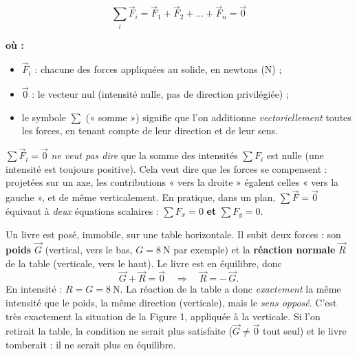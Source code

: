 \documentclass[11pt,a4paper]{article}
\newenvironment{ou}{%
  \par\smallskip\noindent\textbf{où :}\nopagebreak
  \begin{itemize}[leftmargin=1.8em,topsep=2pt,itemsep=1.5pt,parsep=0pt]}%
  {\end{itemize}}
\newcommand{\vv}[1]{\vec{#1}}
\begin{document}
\begin{formule}
\[
\boxed{\;\sum_{i} \vv F_i = \vv F_1 + \vv F_2 + \dots + \vv F_n = \vv 0\;}
\]
\begin{ou}
  \item $\vv F_i$ : chacune des forces appliquées au solide, en newtons (\si{\newton}) ;
  \item $\vv 0$ : le vecteur nul (intensité nulle, pas de direction privilégiée) ;
  \item le symbole $\sum$ (« somme ») signifie que l'on additionne \emph{vectoriellement}
        toutes les forces, en tenant compte de leur direction et de leur sens.
\end{ou}
\end{formule}

\begin{attention}
$\sum \vv F_i = \vv 0$ \emph{ne veut pas dire} que la somme des intensités $\sum F_i$ est nulle
(une intensité est toujours positive). Cela veut dire que les forces se compensent : projetées sur
un axe, les contributions « vers la droite » égalent celles « vers la gauche », et de même
verticalement. En pratique, dans un plan, $\sum \vv F = \vv 0$ équivaut à \emph{deux} équations
scalaires : $\sum F_x = 0$ \textbf{et} $\sum F_y = 0$.
\end{attention}

\begin{exemple}
Un livre est posé, immobile, sur une table horizontale. Il subit deux forces : son \textbf{poids}
$\vv G$ (vertical, vers le bas, $G=\SI{8}{\newton}$ par exemple) et la \textbf{réaction normale}
$\vv R$ de la table (verticale, vers le haut). Le livre est en équilibre, donc
\[
\vv G + \vv R = \vv 0 \quad\Longrightarrow\quad \vv R = -\,\vv G .
\]
En intensité : $R = G = \SI{8}{\newton}$. La réaction de la table a donc \emph{exactement} la même
intensité que le poids, la même direction (verticale), mais le \emph{sens opposé}. C'est très
exactement la situation de la Figure 1, appliquée à la verticale. Si l'on retirait la table, la condition
ne serait plus satisfaite ($\vv G \neq \vv 0$ tout seul) et le livre tomberait : il ne serait plus en
équilibre.
\end{exemple}
\end{document}
